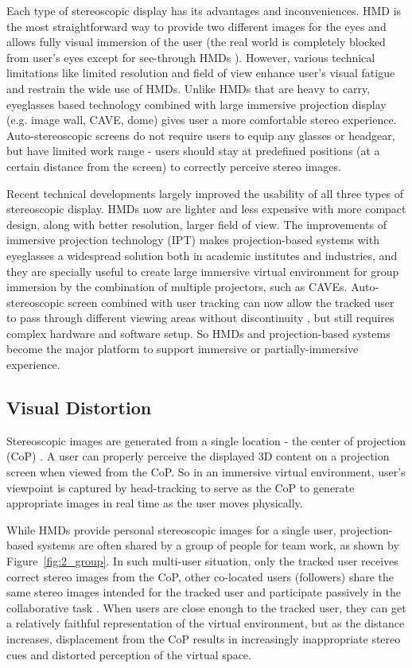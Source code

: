 Each type of stereoscopic display has its advantages and inconveniences. HMD is the most straightforward way to provide two different images for the eyes and allows fully visual immersion of the user (the real world is completely blocked from user's eyes except for see-through HMDs \citep{Schmalstieg2002Stube}). However, various technical limitations like limited resolution and field of view enhance user's visual fatigue and restrain the wide use of HMDs. Unlike HMDs that are heavy to carry, eyeglasses based technology combined with large immersive projection display (e.g. image wall, CAVE, dome) gives user a more comfortable stereo experience. Auto-stereoscopic screens do not require users to equip any glasses or headgear, but have limited work range - users should stay at predefined positions (at a certain distance from the screen) to correctly perceive stereo images.

Recent technical developments largely improved the usability of all three types of stereoscopic display. HMDs now are lighter and less expensive with more compact design, along with better resolution, larger field of view. The improvements of immersive projection technology (IPT) \citep{Bullinger1997Immersive} makes projection-based systems with eyeglasses a widespread solution both in academic institutes and industries, and they are specially useful to create large immersive virtual environment for group immersion by the combination of multiple projectors, such as CAVEs. Auto-stereoscopic screen combined with user tracking can now allow the tracked user to pass through different viewing areas without discontinuity \citep{Kooima2010Tiled}, but still requires complex hardware and software setup. So HMDs and projection-based systems become the major platform to support immersive or partially-immersive experience.


\subsection{Visual Distortion}
Stereoscopic images are generated from a single location - the center of projection (CoP) \citep{Banks2009Perception}. A user can properly perceive the displayed 3D content on a projection screen when viewed from the CoP. So in an immersive virtual environment, user's viewpoint is captured by head-tracking to serve as the CoP to generate appropriate images in real time as the user moves physically.

While HMDs provide personal stereoscopic images for a single user, projection-based systems are often shared by a group of people for team work, as shown by Figure~\ref{fig:2_group}. In such multi-user situation, only the tracked user receives correct stereo images from the CoP, other co-located users (followers) share the same stereo images intended for the tracked user and participate passively in the collaborative task \citep{Bayon2006Multiple}. When users are close enough to the tracked user, they can get a relatively faithful representation of the virtual environment, but as the distance increases, displacement from the CoP results in increasingly inappropriate stereo cues and distorted perception of the virtual space.

